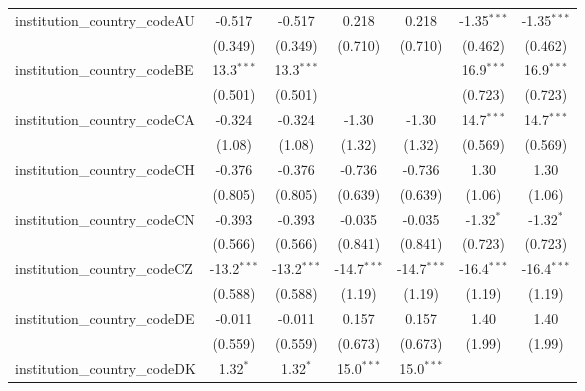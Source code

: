 \begin{tabular}{lcccccc}
   institution\_country\_codeAU          & -0.517        & -0.517        & 0.218         & 0.218         & -1.35$^{***}$ & -1.35$^{***}$\\   
                                         & (0.349)       & (0.349)       & (0.710)       & (0.710)       & (0.462)       & (0.462)\\   
   institution\_country\_codeBE          & 13.3$^{***}$  & 13.3$^{***}$  &               &               & 16.9$^{***}$  & 16.9$^{***}$\\   
                                         & (0.501)       & (0.501)       &               &               & (0.723)       & (0.723)\\   
   institution\_country\_codeCA          & -0.324        & -0.324        & -1.30         & -1.30         & 14.7$^{***}$  & 14.7$^{***}$\\   
                                         & (1.08)        & (1.08)        & (1.32)        & (1.32)        & (0.569)       & (0.569)\\   
   institution\_country\_codeCH          & -0.376        & -0.376        & -0.736        & -0.736        & 1.30          & 1.30\\   
                                         & (0.805)       & (0.805)       & (0.639)       & (0.639)       & (1.06)        & (1.06)\\   
   institution\_country\_codeCN          & -0.393        & -0.393        & -0.035        & -0.035        & -1.32$^{*}$   & -1.32$^{*}$\\   
                                         & (0.566)       & (0.566)       & (0.841)       & (0.841)       & (0.723)       & (0.723)\\   
   institution\_country\_codeCZ          & -13.2$^{***}$ & -13.2$^{***}$ & -14.7$^{***}$ & -14.7$^{***}$ & -16.4$^{***}$ & -16.4$^{***}$\\   
                                         & (0.588)       & (0.588)       & (1.19)        & (1.19)        & (1.19)        & (1.19)\\   
   institution\_country\_codeDE          & -0.011        & -0.011        & 0.157         & 0.157         & 1.40          & 1.40\\   
                                         & (0.559)       & (0.559)       & (0.673)       & (0.673)       & (1.99)        & (1.99)\\   
   institution\_country\_codeDK          & 1.32$^{*}$    & 1.32$^{*}$    & 15.0$^{***}$  & 15.0$^{***}$  &               &   \\   

\end{tabular}
